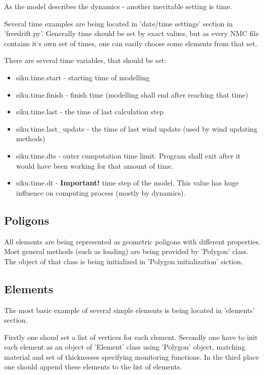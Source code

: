As the model describes the dynamics - another inevitable setting is time.

Several time examples are being located in 'date/time settings' section 
in 'freedrift.py'. Generally time should be set by exact values, but
as every NMC file contains it`s own set of times, one can easily choose 
some elements from that set.

There are several time variables, that should be set:
\begin{itemize}
 \item siku.time.start - starting time of modelling
 \item siku.time.finish - finish time (modelling shall end after reaching 
 that time)
 \item siku.time.last - the time of last calculation step
 \item siku.time.last\_update - the time of last wind update (used by 
 wind updating methods)
 \item siku.time.dts - outer cumputation time limit. Program shall exit 
 after it would have been working for that amount of time.
 \item siku.time.dt - \textbf{Important!} time step of the model. This 
 value has huge influence on computing process (mostly by dynamics).
\end{itemize}

\subsection{Poligons}

All elements are being represented as geometric poligons with different 
properties. Most general methods (such as loading) are being provided by 
'Polygon' class. The object of that class is being initialized in 
'Polygon initialization' siction.

\subsection{Elements}

The most basic example of several simple elements is being located in 
'elements' section. 

Firstly one shoud set a list of vertices for each element.
Secondly one have to init each element as an object of 'Element' class
using 'Polygon' object, matching material and set of thicknesses specifying 
monitoring functions.
In the third place one should append these elements to the list of elements.

